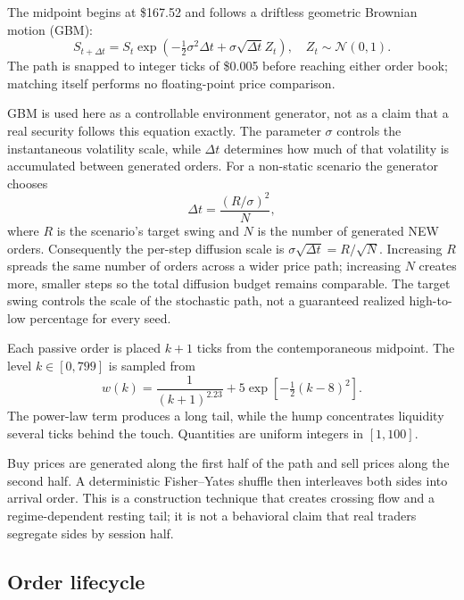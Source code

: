 \documentclass[10pt,twocolumn]{article}
\begin{document}
The midpoint begins at \$167.52 and follows a driftless geometric Brownian
motion (GBM):
\begin{equation}
S_{t+\Delta t}=S_t\exp\!\left(-\tfrac12\sigma^2\Delta t+
\sigma\sqrt{\Delta t}Z_t\right),\quad Z_t\sim\mathcal N(0,1).
\end{equation}
The path is snapped to integer ticks of \$0.005 before reaching either order book;
matching itself performs no floating-point price comparison.

GBM is used here as a controllable environment generator, not as a claim that a
real security follows this equation exactly.  The parameter $\sigma$ controls
the instantaneous volatility scale, while $\Delta t$ determines how much of
that volatility is accumulated between generated orders.  For a non-static
scenario the generator chooses
\begin{equation}
\Delta t=\frac{(R/\sigma)^2}{N},
\end{equation}
where $R$ is the scenario's target swing and $N$ is the number of generated NEW
orders.  Consequently the per-step diffusion scale is
$\sigma\sqrt{\Delta t}=R/\sqrt{N}$.  Increasing $R$ spreads the same number of
orders across a wider price path; increasing $N$ creates more, smaller steps so
the total diffusion budget remains comparable.  The target swing controls the
scale of the stochastic path, not a guaranteed realized high-to-low percentage
for every seed.

Each passive order is placed $k+1$ ticks from the contemporaneous midpoint.
The level $k\in[0,799]$ is sampled from
\begin{equation}
w(k)=\frac{1}{(k+1)^{2.23}}+5\exp\!\left[-\tfrac12(k-8)^2\right].
\end{equation}
The power-law term produces a long tail, while the hump concentrates liquidity
several ticks behind the touch.  Quantities are uniform integers in $[1,100]$.

Buy prices are generated along the first half of the path and sell prices along
the second half.  A deterministic Fisher--Yates shuffle then interleaves both
sides into arrival order.  This is a construction technique that creates
crossing flow and a regime-dependent resting tail; it is not a behavioral claim
that real traders segregate sides by session half.

\subsection{Order lifecycle}
\end{document}
